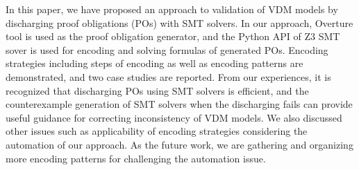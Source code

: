 In this paper, we have proposed an approach to validation of VDM models by discharging proof obligations (POs) with SMT solvers. In our approach, Overture tool is used as the proof obligation generator, and the Python API of Z3 SMT sover is used for encoding and solving formulas of generated POs. Encoding strategies including steps of encoding as well as encoding patterns are demonstrated, and two case studies are reported. From our experiences, it is recognized that discharging POs using SMT solvers is efficient, and the counterexample generation of SMT solvers when the discharging fails can provide useful guidance for correcting inconsistency of VDM models. We also discussed other issues such as applicability of encoding strategies considering the automation of our approach. As the future work, we are gathering and organizing more encoding patterns for challenging the automation issue. 
